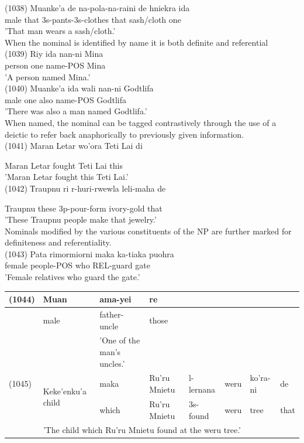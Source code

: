 \documentclass[10pt]{article}
\begin{document}
(1038) Muanke'a de na-pola-na-raini de hniekra ida\\
male that 3s-pants-3s-clothes that sash/cloth one\\
'That man wears a sash/cloth.'\\
When the nominal is identified by name it is both definite and referential\\
(1039) Riy ida nan-ni Mina\\
person one name-POS Mina\\
'A person named Mina.'\\
(1040) Muanke'a ida wali nan-ni Godtlifa\\
male one also name-POS Godtlifa\\
'There was also a man named Godtlifa.'\\
When named, the nominal can be tagged contrastively through the use of a deictic to refer back anaphorically to previously given information.\\
(1041) Maran Letar wo'ora Teti Lai di

Maran Letar fought Teti Lai this\\
'Maran Letar fought this Teti Lai.'\\
(1042) Тraupnu ri r-huri-rwewla leli-maha de

Traupnu these 3p-pour-form ivory-gold that\\
'These Traupnu people make that jewelry.'\\
Nominals modified by the various constituents of the NP are further marked for definiteness and referentiality.\\
(1043) Pata rimormiorni maka ka-tiaka puohra\\
female people-POS who REL-guard gate\\
'Female relatives who guard the gate.'

\begin{center}
\begin{tabular}{|l|l|l|l|l|l|l|l|}
\hline
(1044) & Muan & ama-yei & re &  &  &  &  \\
\hline
 & male & father-uncle & those &  &  &  &  \\
\hline
 &  & 'One of the man's uncles.' &  &  &  &  &  \\
\hline
(1045) & \multirow{2}{*}{Keke'enku'a child} & maka & Ru'ru Mnietu & l-lernana & weru & ko'ra-ni & de \\
\hline
 &  & which & Ru'ru Mnietu & 3s-found & weru & tree & that \\
\hline
 & \multicolumn{7}{|l|}{'The child which Ru'ru Mnietu found at the weru tree.'} \\
\hline
\end{tabular}
\end{center}
\end{document}
